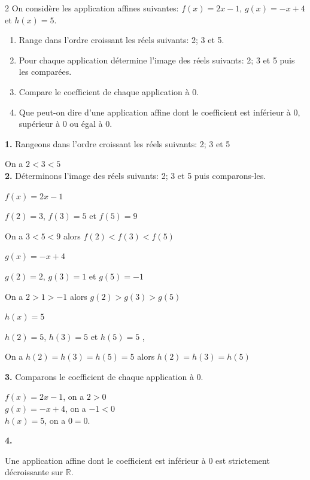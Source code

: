 \begin{multicols*}{2}
 	On considère les application affines suivantes: $ f(x)=2x-1 $, $ g(x)=-x+4 $ et $ h(x)=5 $.
 	\begin{enumerate}
 		\item Range dans l'ordre croissant les réels suivants: 2; 3 et 5.
 		\item Pour chaque application détermine l'image des réels suivants: 2; 3 et 5 puis les comparées.
 		\item Compare le coefficient de chaque application à 0.
 		\item Que peut-on dire d'une application affine dont le coefficient est inférieur à 0, supérieur à 0 ou égal à 0.
 	\end{enumerate}
 	\dure
 	\resul
 	\textbf{1.} Rangeons dans l'ordre croissant les réels suivants: 2; 3 et 5
 	
 	On a  $2<3<5$\\
 	\textbf{2.} Déterminons l'image des réels suivants: 2; 3 et 5 puis  comparons-les.
 	
 	 $ f(x)=2x-1 $
 	
 	$f(2)=3$, $f(3)=5$ et $f(5)=9$
 	
 	On a $3<5<9$ alors $f(2)<f(3)<f(5)$
 	
 	 $g(x)=-x+4$
 	
 	$g(2)=2$, $g(3)=1$ et $g(5)=-1$
 	
 	On a $2>1>-1$ alors $g(2)>g(3)>g(5)$
 	
 	 $ h(x)=5$
 	
 	$ h(2)=5$, $ h(3)=5$ et $ h(5)=5$ , 
 	
 	On a $h(2)=h(3)= h(5)=5$ alors $h(2)=h(3)= h(5)$ 
 	
 	\textbf{3.} Comparons le coefficient de chaque application à 0.
 	
 	 $ f(x)=2x-1 $, on a $2>0$\\
 	 $g(x)=-x+4$, on a  $-1<0$\\
 	 $ h(x)=5$, on a $0=0$.
 	
 	\textbf{4.}
 	
 	 Une application affine dont le coefficient est inférieur à 0 est strictement décroissante sur $\mathbb{R}$.
 	

\end{multicols*}
